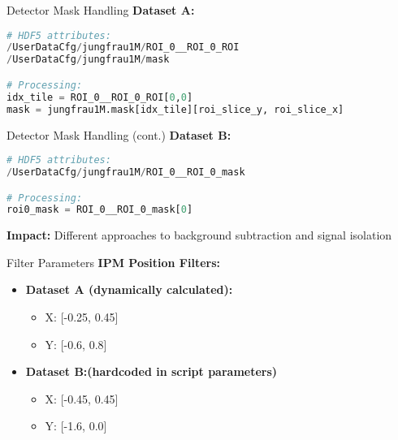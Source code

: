 \documentclass{beamer}
\begin{document}
\begin{frame}[fragile]{Detector Mask Handling}
\textbf{Dataset A:}
\begin{lstlisting}[language=Python]
# HDF5 attributes:
/UserDataCfg/jungfrau1M/ROI_0__ROI_0_ROI
/UserDataCfg/jungfrau1M/mask  

# Processing:
idx_tile = ROI_0__ROI_0_ROI[0,0]
mask = jungfrau1M.mask[idx_tile][roi_slice_y, roi_slice_x]
\end{lstlisting}
\end{frame}

\begin{frame}[fragile]{Detector Mask Handling (cont.)}
\textbf{Dataset B:}
\begin{lstlisting}[language=Python]
# HDF5 attributes:
/UserDataCfg/jungfrau1M/ROI_0__ROI_0_mask

# Processing:
roi0_mask = ROI_0__ROI_0_mask[0]
\end{lstlisting}

\textbf{Impact:} Different approaches to background subtraction and signal isolation
\end{frame}

\begin{frame}{Filter Parameters}
\textbf{IPM Position Filters:}
\begin{itemize}
  \item \textbf{Dataset A (dynamically calculated):}
    \begin{itemize}
    \item X: [-0.25, 0.45]
    \item Y: [-0.6, 0.8]
    \end{itemize}
\item \textbf{Dataset B:(hardcoded in script parameters)}
    \begin{itemize}
    \item X: [-0.45, 0.45]
    \item Y: [-1.6, 0.0]
    \end{itemize}
\end{itemize}
\end{frame}

%
\end{document}
